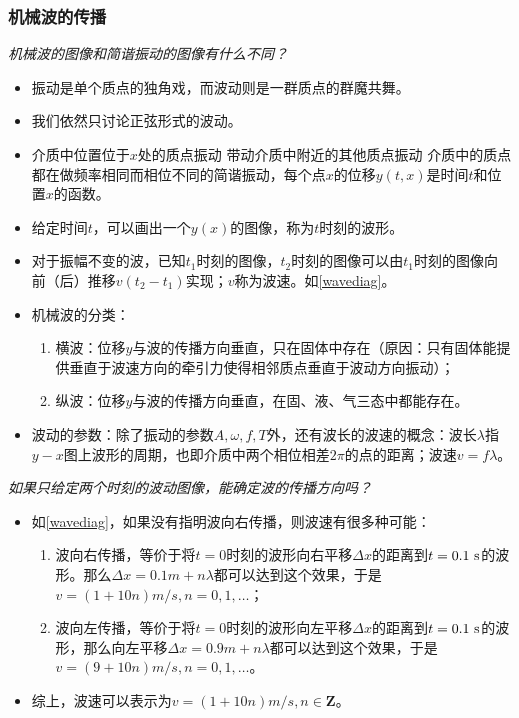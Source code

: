 \documentclass[a4paper,9pt]{ctexart}
\begin{document}
\subsubsection{机械波的传播}
\emph{机械波的图像和简谐振动的图像有什么不同？}
\begin{itemize}
\item
振动是单个质点的独角戏，而波动则是一群质点的群魔共舞。
\item
我们依然只讨论正弦形式的波动。
\item
介质中位置位于$x$处的质点振动 \so 带动介质中附近的其他质点振动 \so 介质中的质点都在做频率相同而相位不同的简谐振动，每个点$x$的位移$y(t,x)$是时间$t$和位置$x$的函数。
\item
给定时间$t$，可以画出一个$y(x)$的图像，称为$t$时刻的波形。
\item
对于振幅不变的波，已知$t_1$时刻的图像，$t_2$时刻的图像可以由$t_1$时刻的图像向前（后）推移$v(t_2-t_1)$实现；$v$称为波速。如\cref{wavediag}。
\item
机械波的分类：
\begin{enumerate}
\item
横波：位移$y$与波的传播方向垂直，只在固体中存在（原因：只有固体能提供垂直于波速方向的牵引力使得相邻质点垂直于波动方向振动）；
\item
纵波：位移$y$与波的传播方向垂直，在固、液、气三态中都能存在。
\end{enumerate}
\item
波动的参数：除了振动的参数$A,\omega,f,T$外，还有波长的波速的概念：波长$\lambda$指$y-x$图上波形的周期，也即介质中两个相位相差$2\pi$的点的距离；波速$v = f\lambda$。
\end{itemize}
\par
\emph{如果只给定两个时刻的波动图像，能确定波的传播方向吗？}
\begin{itemize}
\item
如\cref{wavediag}，如果没有指明波向右传播，则波速有很多种可能：
\begin{enumerate}
\item
波向右传播，等价于将$t=0$时刻的波形向右平移$\Delta x$的距离到$t = 0.1{\rm \ s}$的波形。那么$\Delta x = 0.1\unit{m} + n\lambda$都可以达到这个效果，于是$v = ( 1+ 10n)\unit{m/s},n=0,1,\dots$；
\item
波向左传播，等价于将$t=0$时刻的波形向左平移$\Delta x$的距离到$t = 0.1{\rm \ s}$的波形，那么向左平移$\Delta x = 0.9\unit{m} + n\lambda$都可以达到这个效果，于是$ v = (9+10n)\unit{m/s},n=0,1,\dots$。
\end{enumerate}
\item
综上，波速可以表示为$v = (1+10n)\unit{m/s},n \in {\mathbf Z}$。
\end{itemize}
\end{document}
